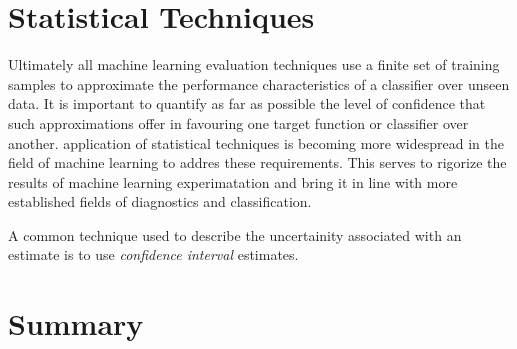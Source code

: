 \documentclass[10pt]{unbthesis}
\begin{document}
\section*{Statistical Techniques}
Ultimately all machine learning evaluation techniques use a finite set
of training samples to approximate the performance characteristics of
a classifier over unseen data. It is important to quantify as far as
possible the level of confidence that such approximations offer in
favouring one target function or classifier over another. 
application of statistical techniques is becoming more widespread in
the field of machine learning to addres these requirements. This
serves to rigorize the results of machine learning experimatation and
bring it in line with more established fields of diagnostics and
classification. 

A common technique used to describe the uncertainity associated with
an estimate is to use \textit{confidence interval} estimates.




\section*{Summary}


\renewcommand{\bibname}{References}



\end{document}
